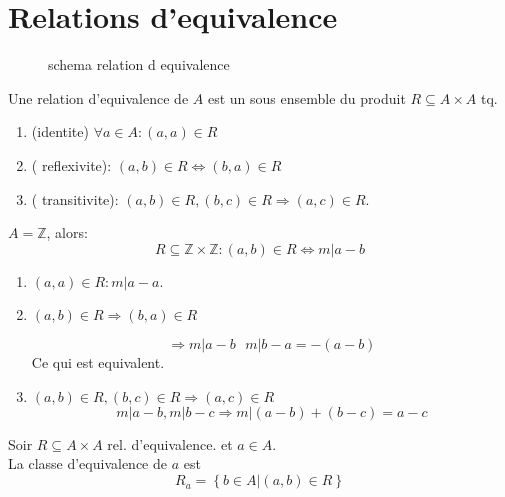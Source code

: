 \documentclass[../main.tex]{subfiles}
\begin{document}
\section{Relations d'equivalence}
\begin{figure}[ht]
    \centering
    \caption{schema relation d equivalence}
    \label{fig:schema-relation-d-equivalence}
\end{figure}
\begin{defn}\label{defn:relations_d_equivalence}
	Une relation d'equivalence de $A$ est un sous ensemble du produit $R \subseteq A \times A$ tq.
	\begin{enumerate}
		\item (identite) $\forall a \in A: ( a,a) \in R	$\\
		\item ( reflexivite): $(a,b) \in R \iff ( b,a) \in R$ \\
		\item ( transitivite): $(a,b) \in R, ( b,c) \in R \Rightarrow ( a,c)\in R$.
	\end{enumerate}
\end{defn}
\begin{exemple}
$A= \mathbb{Z}$, alors:
\[ 
	R \subseteq \mathbb{Z}\times \mathbb{Z}: ( a,b) \in R \iff m \vert a-b
\]
\begin{enumerate}
	\item $(a,a) \in R: m \vert a-a$.\\
	\item $( a,b) \in R \Rightarrow ( b,a) \in R$

		\[ 
			\Rightarrow m \vert a-b \text{  } m \vert b-a = -(a-b)
		\]
	Ce qui est equivalent.\\
\item $(a,b) \in R, ( b,c) \in R \Rightarrow ( a,c) \in R$\\
	\[ 
		m \vert a-b , m | b-c \Rightarrow m \vert ( a-b)+ ( b-c) = a-c
	\]
	
\end{enumerate}
\end{exemple}
\begin{defn}\label{defn:classes_d_equivalence}
	Soir $R \subseteq A \times A$ rel. d'equivalence. et $a \in A$.\\
	La classe d'equivalence de $a$ est
	\[ 
		R_a= \left\{ b \in A \vert ( a,b) \in R \right\} 
	\]
\end{defn}
\end{document}

